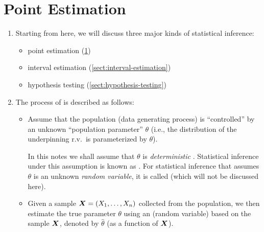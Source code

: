 \section{Point Estimation}
\label{sect:point-estimation}
\begin{enumerate}
\item Starting from here, we will discuss three major kinds of statistical
inference:
\begin{itemize}
\item point estimation (\cref{sect:point-estimation})
\item interval estimation (\cref{sect:interval-estimation})
\item hypothesis testing (\cref{sect:hypothesis-testing})
\end{itemize}
\item The process of  is described as follows:
\begin{itemize}
\item Assume that the population (data generating process) is ``controlled'' by
an unknown ``population parameter'' \(\theta\) (i.e., the distribution of the
underpinning r.v.\ is parameterized by \(\theta\)).

\begin{note}
In this notes we shall assume that \(\theta\) is
\emph{deterministic }. Statistical inference under this assumption
is known as .  For statistical
inference that assumes \(\theta\) is an unknown \emph{random
variable}, it is called  (which will not
be discussed here).
\end{note}

\item Given a sample \(\vb*{X}=(X_1,\dotsc,X_n)\) collected from the
population, we then estimate the true parameter \(\theta\) using an 
(random variable) based on the sample \(\vb*{X}\), denoted by \(\widehat{\theta}\)
(as a function of \(\vb*{X}\)).


\end{itemize}
\end{enumerate}
